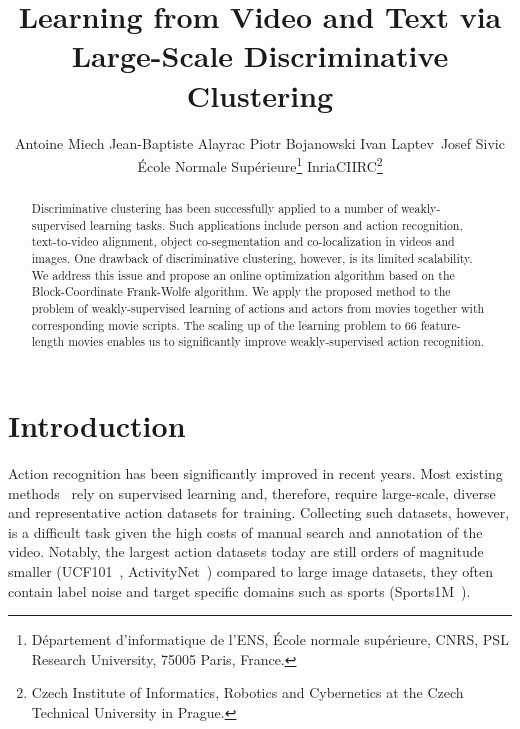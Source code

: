 \documentclass[10pt,twocolumn,letterpaper]{article}
\begin{document}
\title{Learning from Video and Text via Large-Scale Discriminative Clustering}

\author{Antoine Miech \quad Jean-Baptiste Alayrac \quad Piotr Bojanowski \quad Ivan Laptev\, \quad Josef Sivic\\
École Normale Supérieure\thanks{Département d’informatique de l’ENS, École normale supérieure, CNRS, PSL Research University, 75005 Paris, France.} \quad \quad \quad Inria\quad \quad \quad CIIRC\thanks{Czech Institute of Informatics, Robotics and Cybernetics at the Czech Technical University in Prague.}\\
}
\renewcommand\footnotemark{}


\maketitle
\begin{abstract}

  Discriminative clustering has been successfully applied to a number of weakly-supervised learning tasks. 
  Such applications include person and action recognition, text-to-video alignment, object co-segmentation and co-localization in videos and images. 
  One drawback of discriminative clustering, however, is its limited scalability.
  We address this issue and propose an online optimization algorithm based on the Block-Coordinate Frank-Wolfe algorithm.
  We apply the proposed method to the problem of weakly-supervised learning of actions and actors from movies together with corresponding movie scripts.
  The scaling up of the learning problem to 66 feature-length movies enables us to significantly improve weakly-supervised action recognition.
 \end{abstract}



\section{Introduction}

Action recognition has been significantly improved in recent years. Most existing methods~\cite{laptev08learning,simonyan2014,wang13action,wang2015}
rely on supervised learning and, therefore, require large-scale, diverse and representative action datasets for training.
Collecting such datasets, however, is a difficult task given the high costs of manual search and annotation of the video.
Notably, the largest action datasets today are still orders of magnitude smaller (UCF101~\cite{soomro2012}, ActivityNet~\cite{caba2015activitynet})
compared to large image datasets, they often contain label noise and target specific domains such as sports (Sports1M~\cite{karpathy2014}).
\end{document}
